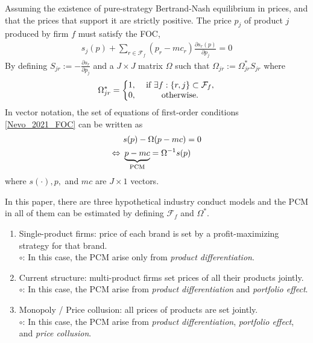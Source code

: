 \documentclass[11pt]{elegantbook}
\begin{document}
Assuming the existence of pure-strategy Bertrand-Nash equilibrium in prices, and that the prices that support it are strictly positive. The price $p_j$ of product $j$ produced by firm $f$ must satisfy the FOC,
\begin{equation}
    \begin{aligned}
        s_j(p)+\sum_{r\in\mathcal{F}_f}(p_r-mc_r)\frac{\partial s_r(p)}{\partial p_j}=0
    \end{aligned}
    \label{Nevo_2021_FOC}
\end{equation}
By defining $S_{jr}:=-\frac{\partial s_r}{\partial p_j}$ and a $J\times J$ matrix $\Omega$ such that $\Omega_{jr}:=\Omega_{jr}^*S_{jr}$ where $$\Omega_{jr}^*=\left\{\begin{matrix}
    1,& \textnormal{ if }\exists f:\{r,j\}\subset \mathcal{F}_f,\\
    0,& \textnormal{ otherwise}.
\end{matrix}\right.$$
In vector notation, the set of equations of first-order conditions \eqref{Nevo_2021_FOC} can be written as
\begin{equation}
    \begin{aligned}
        &s(p)-\Omega(p-mc)=0\\
        \Leftrightarrow\ &\underbrace{p-mc}_\textnormal{PCM}=\Omega^{-1}s(p)
    \end{aligned}
    \nonumber
\end{equation}
where $s(\cdot),p,$ and $mc$ are $J\times 1$ vectors.

In this paper, there are three hypothetical industry conduct models and the PCM in all of them can be estimated by defining $\mathcal{F}_f$ and $\Omega^*$.
\begin{enumerate}
    \item Single-product firms: price of each brand is set by a profit-maximizing strategy for that brand.\\
    $\circ$: In this case, the PCM arise only from \textit{product differentiation}.
    \item Current structure: multi-product firms set prices of all their products jointly.\\
    $\circ$: In this case, the PCM arise from \textit{product differentiation} and \textit{portfolio effect}.
    \item Monopoly / Price collusion: all prices of products are set jointly.\\
    $\circ$: In this case, the PCM arise from \textit{product differentiation}, \textit{portfolio effect}, and \textit{price collusion}.
\end{enumerate}
\end{document}
